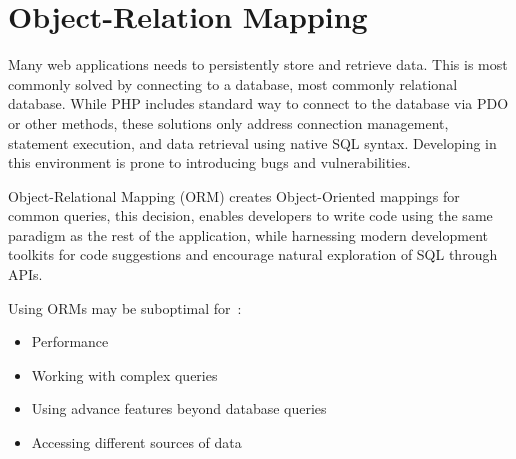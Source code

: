\section{Object-Relation Mapping}\label{sec:object-relation-mapping}
Many web applications needs to persistently store and retrieve data.
This is most commonly solved by connecting to a database, most commonly relational database.
While PHP includes standard way to connect to the database via PDO or other methods,
these solutions only address connection management, statement execution, and data retrieval using native SQL syntax.
Developing in this environment is prone to introducing bugs and vulnerabilities.

Object-Relational Mapping (ORM) creates Object-Oriented mappings for common queries, this decision, enables developers
to write code using the same paradigm as the rest of the application, while harnessing modern development toolkits for
code suggestions and encourage natural exploration of SQL through APIs.

Using ORMs may be suboptimal for~\parencite{orm}:

\begin{itemize}
    \item Performance
    \item Working with complex queries
    \item Using advance features beyond database queries
    \item Accessing different sources of data
\end{itemize}
